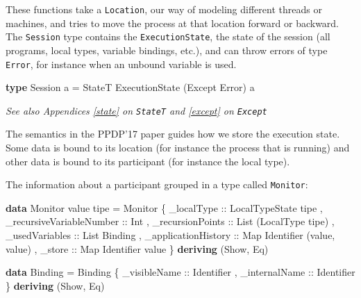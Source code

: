 \documentclass[runningheads,plain]{llncs}
\newenvironment{Shaded}{}{}
\newcommand{\KeywordTok}[1]{\textcolor[rgb]{0.00,0.44,0.13}{\textbf{#1}}}
\newcommand{\DataTypeTok}[1]{\textcolor[rgb]{0.56,0.13,0.00}{#1}}
\newcommand{\OtherTok}[1]{\textcolor[rgb]{0.00,0.44,0.13}{#1}}
\newcommand{\FunctionTok}[1]{\textcolor[rgb]{0.02,0.16,0.49}{#1}}
\newcommand{\NormalTok}[1]{#1}
\begin{document}
These functions take a \texttt{Location}, our way of modeling different
threads or machines, and tries to move the process at that location
forward or backward. The \texttt{Session} type contains the
\texttt{ExecutionState}, the state of the session (all programs, local
types, variable bindings, etc.), and can throw errors of type
\texttt{Error}, for instance when an unbound variable is used.

\begin{Shaded}
\begin{Highlighting}[]
\KeywordTok{type} \DataTypeTok{Session}\NormalTok{ a }\FunctionTok{=} \DataTypeTok{StateT} \DataTypeTok{ExecutionState}\NormalTok{ (}\DataTypeTok{Except} \DataTypeTok{Error}\NormalTok{) a}
\end{Highlighting}
\end{Shaded}

\emph{See also Appendices \ref{state} on \texttt{StateT} and
\ref{except} on \texttt{Except}}

The semantics in the PPDP'17 paper guides how we store the execution
state. Some data is bound to its location (for instance the process that
is running) and other data is bound to its participant (for instance the
local type).

The information about a participant grouped in a type called
\texttt{Monitor}:

\begin{Shaded}
\begin{Highlighting}[]
\KeywordTok{data} \DataTypeTok{Monitor}\NormalTok{ value tipe }\FunctionTok{=} 
    \DataTypeTok{Monitor} 
\NormalTok{        \{}\OtherTok{ _localType ::} \DataTypeTok{LocalTypeState}\NormalTok{ tipe}
\NormalTok{        ,}\OtherTok{ _recursiveVariableNumber ::} \DataTypeTok{Int}
\NormalTok{        ,}\OtherTok{ _recursionPoints ::} \DataTypeTok{List}\NormalTok{ (}\DataTypeTok{LocalType}\NormalTok{ tipe)}
\NormalTok{        ,}\OtherTok{ _usedVariables ::} \DataTypeTok{List} \DataTypeTok{Binding} 
\NormalTok{        ,}\OtherTok{ _applicationHistory ::} \DataTypeTok{Map} \DataTypeTok{Identifier}\NormalTok{ (value, value)}
\NormalTok{        ,}\OtherTok{ _store ::} \DataTypeTok{Map} \DataTypeTok{Identifier}\NormalTok{ value }
\NormalTok{        \}}
        \KeywordTok{deriving}\NormalTok{ (}\DataTypeTok{Show}\NormalTok{, }\DataTypeTok{Eq}\NormalTok{)}

\KeywordTok{data} \DataTypeTok{Binding} \FunctionTok{=} 
    \DataTypeTok{Binding} 
\NormalTok{        \{}\OtherTok{ _visibleName ::} \DataTypeTok{Identifier}
\NormalTok{        ,}\OtherTok{ _internalName ::} \DataTypeTok{Identifier} 
\NormalTok{        \}}
    \KeywordTok{deriving}\NormalTok{ (}\DataTypeTok{Show}\NormalTok{, }\DataTypeTok{Eq}\NormalTok{) }
\end{Highlighting}
\end{Shaded}
\end{document}
